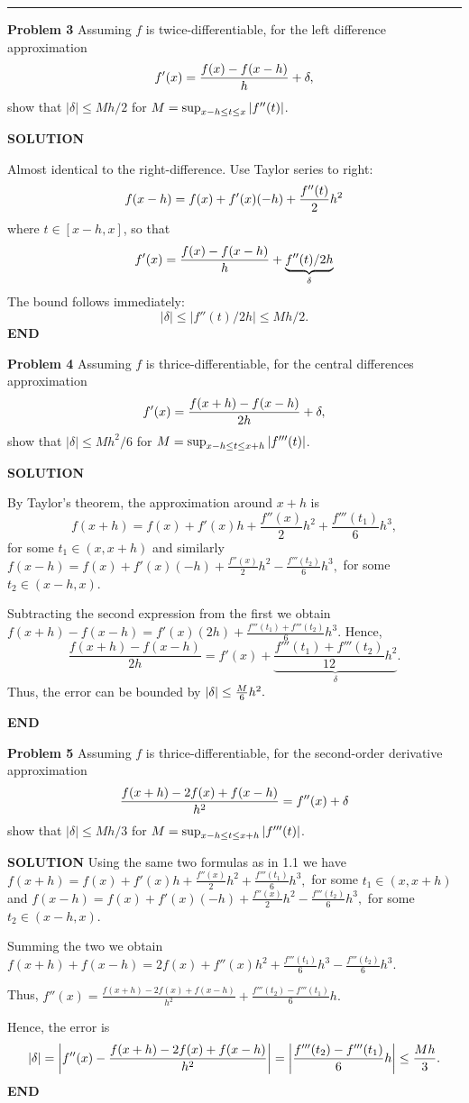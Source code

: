 \documentclass[12pt,a4paper]{article}
\begin{document}
\rule{\textwidth}{1pt}
\textbf{Problem 3} Assuming $f$ is twice-differentiable, for the left difference approximation
\[
f'(x) = {f(x) - f(x - h) \over h} + \ensuremath{\delta},
\]
show that $|\ensuremath{\delta}| \ensuremath{\leq} Mh/2$ for $M = \sup_{x-h \leq t \leq x}\left|{f''(t)}\right|$.

\textbf{SOLUTION}

Almost identical to the right-difference. Use Taylor series to right:
\[
f(x-h) = f(x) + f'(x) (-h) + {f''(t) \over 2} h^2
\]
where $t \ensuremath{\in} [x-h,x]$, so that
\[
f'(x) = {f(x) - f(x-h) \over h} + \underbrace{f''(t)/2 h}_\ensuremath{\delta}
\]
The bound follows immediately:
\[
|\ensuremath{\delta}| \ensuremath{\leq} |f''(t)/2 h| \ensuremath{\leq} Mh/2.
\]
\textbf{END}

\textbf{Problem 4} Assuming $f$ is thrice-differentiable, for the central differences approximation
\[
f'(x) = {f(x + h) - f(x - h) \over 2h} + \ensuremath{\delta},
\]
show that $|\ensuremath{\delta}| \ensuremath{\leq} Mh^2/6$ for $M = \sup_{x-h \leq t \leq x+h}\left|{f'''(t)}\right|$.

\textbf{SOLUTION}

By Taylor's theorem, the approximation around $x+h$ is
\[
f(x+h) = f(x) + f'(x)h + \frac{f''(x)}{2}h^2 + \frac{f'''(t_1)}{6}h^3,
\]
for some $t_1 \ensuremath{\in} (x, x+h)$ and similarly $f(x-h) = f(x) + f'(x)(-h) + \frac{f''(x)}{2}h^2 - \frac{f'''(t_2)}{6}h^3,$ for some $t_2 \ensuremath{\in} (x-h, x)$.

Subtracting the second expression from the first we obtain $f(x+h)-f(x-h) = f'(x)(2h) + \frac{f'''(t_1)+f'''(t_2)}{6}h^3.$ Hence,
\[
\frac{f(x+h)-f(x-h)}{2h} = f'(x)  + \underbrace{\frac{f'''(t_1)+f'''(t_2)}{12}h^2}_{\ensuremath{\delta}}.
\]
Thus, the error can be bounded by $\left|\ensuremath{\delta}\right| \ensuremath{\leq} {M \over 6} h^2.$

\textbf{END}

\textbf{Problem 5}  Assuming $f$ is thrice-differentiable, for the second-order derivative approximation
\[
{f(x+h) - 2f(x) + f(x-h) \over h^2} = f''(x) + \ensuremath{\delta}
\]
show that $|\ensuremath{\delta}| \ensuremath{\leq} Mh/3$ for $M = \sup_{x-h \leq t \leq x+h}\left|{f'''(t)}\right|$.

\textbf{SOLUTION} Using the same two formulas as in 1.1 we have $f(x+h) = f(x) + f'(x)h + \frac{f''(x)}{2}h^2 + \frac{f'''(t_1)}{6}h^3,$ for some $t_1 \ensuremath{\in} (x, x+h)$ and $f(x-h) = f(x) + f'(x)(-h) + \frac{f''(x)}{2}h^2 - \frac{f'''(t_2)}{6}h^3,$ for some $t_2 \ensuremath{\in} (x-h, x)$.

Summing the two we obtain $f(x+h) + f(x-h) = 2f(x) + f''(x)h^2 + \frac{f'''(t_1)}{6}h^3 - \frac{f'''(t_2)}{6}h^3.$

Thus, $f''(x) = \frac{f(x+h) - 2f(x) + f(x-h)}{h^2} + \frac{f'''(t_2) - f'''(t_1)}{6}h.$

Hence, the error is
\[
|\ensuremath{\delta}| = \left|f''(x) - {f(x+h) - 2f(x) + f(x-h) \over h^2} \right| = \left|\frac{f'''(t_2) - f'''(t_1)}{6}h\right|\ensuremath{\leq} {Mh \over 3}.
\]
\textbf{END}
\end{document}
